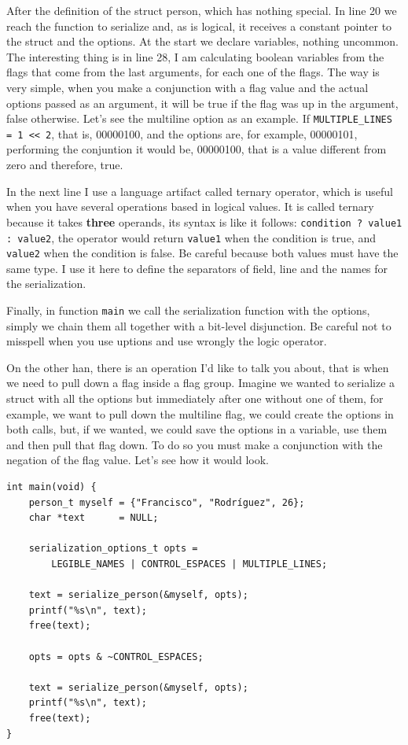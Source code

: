 \documentclass[a4paper]{article}
\begin{document}
After the definition of the struct person, which has nothing special. In line 20
we reach the function to serialize and, as is logical, it receives a constant
pointer to the struct and the options. At the start we declare variables,
nothing uncommon. The interesting thing is in line 28, I am calculating boolean
variables from the flags that come from the last arguments, for each one of the
flags. The way is very simple, when you make a conjunction with a flag value
and the actual options passed as an argument, it will be true if the flag was up
in the argument, false otherwise. Let's see the multiline option as an example.
If \verb!MULTIPLE_LINES = 1 << 2!, that is, 00000100, and the options are, for
example, 00000101, performing the conjuntion it would be, 00000100, that is
a value different from zero and therefore, true.

In the next line I use a language artifact called ternary operator, which is
useful when you have several operations based in logical values. It is called
ternary because it takes \textbf{three} operands, its syntax is like it follows:
\verb!condition ? value1 : value2!, the operator would return \verb!value1! when
the condition is true, and \verb!value2! when the condition is false. Be
careful because both values must have the same type. I use it here to define
the separators of field, line and the names for the serialization.

Finally, in function \verb!main! we call the serialization function with the
options, simply we chain them all together with a bit-level disjunction. Be
careful not to misspell when you use uptions and use wrongly the logic operator.

On the other han, there is an operation I'd like to talk you about, that is
when we need to pull down a flag inside a flag group. Imagine we wanted to
serialize a struct with all the options but immediately after one without one of
them, for example, we want to pull down the multiline flag, we could create the
options in both calls, but, if we wanted, we could save the options in a
variable, use them and then pull that flag down. To do so you must make a
conjunction with the negation of the flag value. Let's see how it would look.

\noindent
\begin{minipage}[H]{\linewidth}
\mbox{}
\begin{lstlisting}[style=C, label={lst:setFlagOff},
caption={Example of pulling down a flag}]
int main(void) {
    person_t myself = {"Francisco", "Rodríguez", 26};
    char *text      = NULL;

    serialization_options_t opts =
        LEGIBLE_NAMES | CONTROL_ESPACES | MULTIPLE_LINES;

    text = serialize_person(&myself, opts);
    printf("%s\n", text);
    free(text);

    opts = opts & ~CONTROL_ESPACES;

    text = serialize_person(&myself, opts);
    printf("%s\n", text);
    free(text);
}
\end{lstlisting}
\end{minipage}
\end{document}
